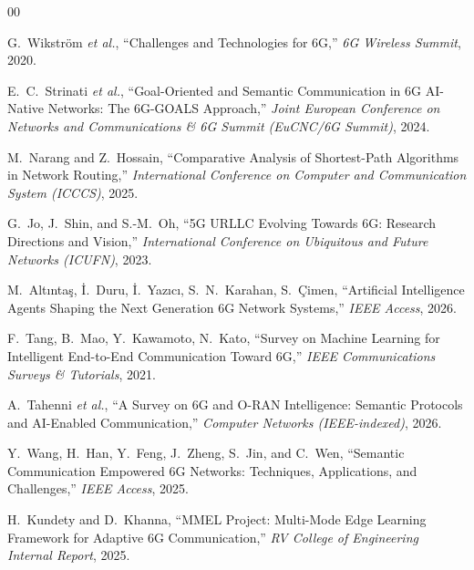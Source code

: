 \documentclass[conference]{IEEEtran}
\begin{document}
\begin{thebibliography}{00}

G.~Wikstr\"{o}m \textit{et al.}, ``Challenges and Technologies for 6G,''
\emph{6G Wireless Summit}, 2020.

E.~C.~Strinati \textit{et al.}, ``Goal-Oriented and Semantic Communication
in 6G AI-Native Networks: The 6G-GOALS Approach,'' \emph{Joint European
Conference on Networks and Communications \& 6G Summit (EuCNC/6G Summit)},
2024.

M.~Narang and Z.~Hossain, ``Comparative Analysis of Shortest-Path Algorithms
in Network Routing,'' \emph{International Conference on Computer and
Communication System (ICCCS)}, 2025.

G.~Jo, J.~Shin, and S.-M.~Oh, ``5G URLLC Evolving Towards 6G: Research
Directions and Vision,'' \emph{International Conference on Ubiquitous and
Future Networks (ICUFN)}, 2023.

M.~Alt\i nta\c{s}, \.{I}.~Duru, \.{I}.~Yaz\i c\i, S.~N.~Karahan,
S.~\c{C}imen, ``Artificial Intelligence Agents Shaping the Next Generation
6G Network Systems,'' \emph{IEEE Access}, 2026.

F.~Tang, B.~Mao, Y.~Kawamoto, N.~Kato, ``Survey on Machine Learning for
Intelligent End-to-End Communication Toward 6G,'' \emph{IEEE Communications
Surveys \& Tutorials}, 2021.

A.~Tahenni \textit{et al.}, ``A Survey on 6G and O-RAN Intelligence:
Semantic Protocols and AI-Enabled Communication,''
\emph{Computer Networks (IEEE-indexed)}, 2026.

Y.~Wang, H.~Han, Y.~Feng, J.~Zheng, S.~Jin, and C.~Wen,
``Semantic Communication Empowered 6G Networks: Techniques, Applications,
and Challenges,'' \emph{IEEE Access}, 2025.

H.~Kundety and D.~Khanna, ``MMEL Project: Multi-Mode Edge Learning
Framework for Adaptive 6G Communication,''
\emph{RV College of Engineering Internal Report}, 2025.

\end{thebibliography}
\end{document}
